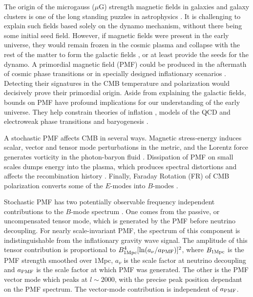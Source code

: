 The origin of the microgauss ($\mu$G) strength magnetic fields in galaxies and galaxy clusters is one of the long standing puzzles in astrophysics \cite{Durrer:2013pga}. It is challenging to explain such fields based solely on the dynamo mechanism, without there being some initial seed field. However, if magnetic fields were present in the early universe, they would remain frozen in the cosmic plasma and collapse with the rest of the matter to form the galactic fields \cite{Grasso:2000wj}, or at least provide the seeds for the dynamo. A primordial magnetic field (PMF) could be produced in the aftermath of cosmic phase transitions \cite{Vachaspati:1991nm} or in specially designed inflationary scenarios \cite{Turner:1987bw,Ratra:1991bn}. Detecting their signatures in the CMB temperature and polarization would decisively prove their primordial origin. Aside from explaining the galactic fields, bounds on PMF have profound implications for our understanding of the early universe.  They help constrain theories of inflation \cite{Bonvin:2011dt}, models of the QCD and electroweak phase transitions \cite{Caprini:2007xq} and baryogenesis \cite{Vachaspati:2001nb}.

A stochastic PMF affects CMB in several ways. Magnetic stress-energy induces scalar, vector and tensor mode perturbations in the metric, and the Lorentz force generates vorticity in the photon-baryon fluid \cite{Subramanian:1998fn,Mack:2001gc,Lewis:2004ef,Shaw:2009nf,Paoletti:2010rx}. Dissipation of PMF on small scales dumps energy into the plasma, which produces spectral distortions and affects the recombination history \cite{Kunze:2014eka}.  Finally, Faraday Rotation (FR) of CMB polarization converts some of the $E$-modes into $B$-modes \cite{Kosowsky:2004zh,Pogosian:2011qv}.

Stochastic PMF has two potentially observable frequency independent contributions to the $B$-mode spectrum \cite{Shaw:2009nf}. One comes from the passive, or uncompensated tensor mode, which is generated by the PMF before neutrino decoupling. For nearly scale-invariant PMF, the spectrum of this component is indistinguishable from the inflationary gravity wave signal. The amplitude of this tensor contribution is proportional to $B^4_{1\rm{Mpc}} [\ln(a_\nu / a_{\rm{PMF}})]^2$, where $B_{1\rm{Mpc}}$ is the PMF strength smoothed over $1$Mpc, $a_\nu$ is the scale factor at neutrino decoupling and $a_{\rm{PMF}}$ is the scale factor at which PMF was generated. The other is the PMF vector mode which peaks at $l \sim 2000$, with the precise peak position dependant on the PMF spectrum. The vector-mode contribution is independent of $a_{\rm{PMF}}$. 

